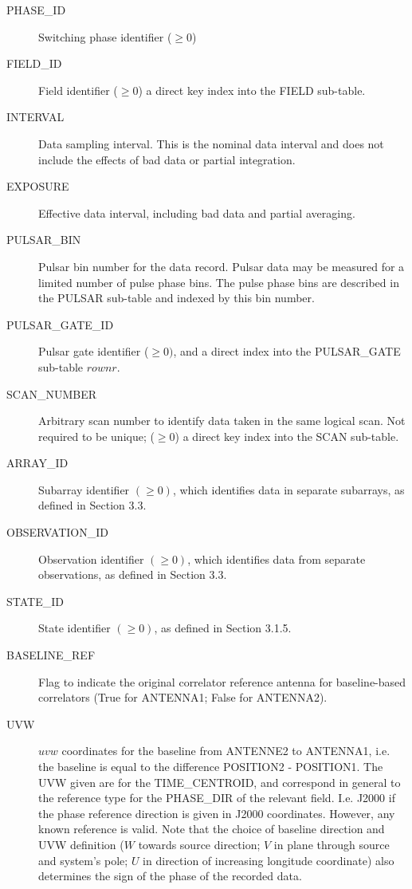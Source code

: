 \documentclass{article}
\begin{document}
\begin{description}
\item[PHASE\_ID] Switching phase identifier ($\geq 0$)

\item[FIELD\_ID] Field identifier ($\geq 0$) a direct key index into the FIELD sub-table.

\item[INTERVAL] Data sampling interval. This is the nominal data
interval and does not include the effects of bad data or partial
integration.

\item[EXPOSURE] Effective data interval, including bad data and
partial averaging.

\item[PULSAR\_BIN] Pulsar bin number for the data record. Pulsar data
may be measured for a limited number of pulse phase bins. The pulse
phase bins are described in the PULSAR sub-table and indexed by this
bin number.

\item[PULSAR\_GATE\_ID] Pulsar gate identifier ($\geq 0)$, and a direct
index into the PULSAR\_GATE sub-table $rownr$.

\item[SCAN\_NUMBER] Arbitrary scan number to identify data taken in
  the same logical scan. Not required to be unique; ($\geq 0$) a
  direct key index into the SCAN sub-table.

\item[ARRAY\_ID] Subarray identifier $(\geq 0)$, which identifies data
in separate subarrays, as defined in Section 3.3.

\item[OBSERVATION\_ID] Observation identifier $(\geq 0)$, which identifies
data from separate observations, as defined in Section 3.3.

\item[STATE\_ID] State identifier $(\geq 0)$, as defined in Section 3.1.5.

\item[BASELINE\_REF] Flag to indicate the original correlator
reference antenna for baseline-based correlators (True for ANTENNA1;
False for ANTENNA2).

\item[UVW] $uvw$ coordinates for the baseline from ANTENNE2 to ANTENNA1,
   i.e. the
   baseline is equal to the difference POSITION2 - POSITION1. The UVW given
   are for the TIME\_CENTROID, and correspond in general to the reference type
   for the PHASE\_DIR of the relevant field. I.e. J2000 if the phase reference
   direction is given in J2000 coordinates. However, any known reference is
   valid.
   Note that the choice of baseline direction and UVW definition ($W$ towards
   source direction; $V$ in plane through source and system's pole; $U$ in
   direction of increasing longitude coordinate) also determines the sign of
   the phase of the recorded data.


\end{description}
\end{document}
